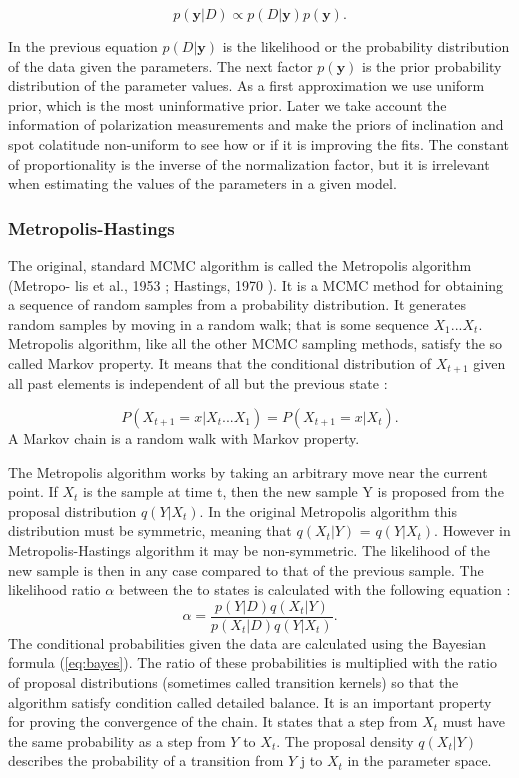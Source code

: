 \documentclass{wihuri}
\def\be{\begin{equation}}
\def\ee{\end{equation}}
\begin{document}
\be \label{eq:bayes}
p(\textbf{y}|D) \propto p(D|\textbf{y})p(\textbf{y}).
\ee

In the previous equation $p(D|\textbf{y})$ is the likelihood or the probability distribution of the data given the parameters. The next factor $p(\textbf{y})$ is the prior probability distribution of the parameter values. As a first approximation we use uniform prior, which is the most uninformative prior. Later we take account the information of polarization measurements and make the priors of inclination and spot colatitude non-uniform to see how or if it is improving the fits. The constant of proportionality is the inverse of the normalization factor, but it is irrelevant when estimating the values of the parameters in a given model. 


\subsubsection{Metropolis-Hastings}

The original, standard MCMC algorithm is called the Metropolis algorithm (Metropo-
lis et al., 1953 \cite{metropolis53}; Hastings, 1970 \cite{hastings70}). It is a MCMC method for obtaining a sequence of random samples from a probability distribution. It generates random samples by moving in a random walk; that is some sequence $X_{1}...X_{t}$. Metropolis algorithm, like all the other MCMC sampling methods, satisfy the so called Markov property. It means that the conditional distribution of $X_{t+1}$ given all past elements is independent of all but the previous state \cite{kaiser}:

 \be \label{eq:markov_prop}
P(X_{t+1} = x|X_{t}. . . X_{1}) = P(X_{t+1} = x|X_{t}).
\ee
A Markov chain is a random walk with Markov property.
 
The Metropolis algorithm works by taking an arbitrary move near the current
point. If $X_{t}$ is the sample at time t, then the new sample Y is proposed from the proposal distribution $q(Y|X_{t})$. In the original Metropolis algorithm this distribution must be symmetric, meaning that $q(X_{t}|Y)$ = $q(Y|X_{t})$. However in Metropolis-Hastings algorithm it may be non-symmetric. The likelihood of the new sample is then in any case compared to that of the previous sample. The likelihood ratio $\alpha$ between the to states is calculated with the following equation \cite{tuomi}:
\be \label{eq:likely_ratio} 
\alpha = \frac{p(Y|D)q(X_{t}|Y)}{p(X_{t}|D)q(Y|X_{t})}.
\ee
The conditional probabilities given the data are calculated using the Bayesian formula (\ref{eq:bayes}). The ratio of these probabilities is multiplied with the ratio of proposal distributions (sometimes called transition kernels) so that the algorithm satisfy condition called detailed balance. It is an important property for proving the convergence of the chain. It states that a step from $X_{t}$ must have the same probability as a step from $Y$ to $X_{t}$.  The proposal density $q(X_{t}|Y)$ describes the probability of a transition from $Y$ j to $X_{t}$ in the parameter space.
\end{document}
